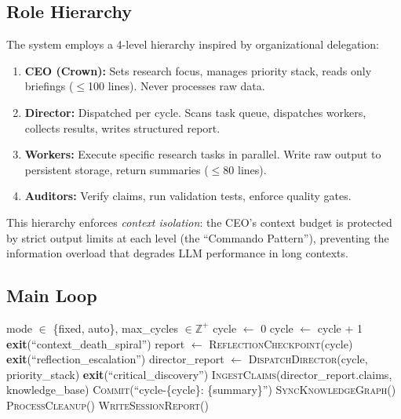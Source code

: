 \documentclass[11pt,a4paper]{article}
\begin{document}
\subsection{Role Hierarchy}
\label{sec:roles}

The system employs a 4-level hierarchy inspired by organizational delegation:

\begin{enumerate}[nosep]
    \item \textbf{CEO (Crown):} Sets research focus, manages priority stack, reads
          only briefings ($\leq$100 lines). Never processes raw data.
    \item \textbf{Director:} Dispatched per cycle. Scans task queue, dispatches
          workers, collects results, writes structured report.
    \item \textbf{Workers:} Execute specific research tasks in parallel. Write raw
          output to persistent storage, return summaries ($\leq$80 lines).
    \item \textbf{Auditors:} Verify claims, run validation tests, enforce quality gates.
\end{enumerate}

This hierarchy enforces \emph{context isolation}: the CEO's context budget is
protected by strict output limits at each level (the ``Commando Pattern''), preventing
the information overload that degrades LLM performance in long contexts.

\subsection{Main Loop}
\label{sec:loop}

\begin{algorithm}[t]
\caption{Keter Autonomous Research Loop}
\label{alg:loop}
\begin{algorithmic}[1]
\REQUIRE mode $\in$ \{fixed, auto\}, max\_cycles $\in \mathbb{Z}^+$
\STATE cycle $\leftarrow$ 0
    \STATE cycle $\leftarrow$ cycle + 1
        \STATE \textbf{exit}(``context\_death\_spiral'')
    \ENDIF
        \STATE report $\leftarrow$ \textsc{ReflectionCheckpoint}(cycle)
            \STATE \textbf{exit}(``reflection\_escalation'')
        \ENDIF
    \ENDIF
    \STATE director\_report $\leftarrow$ \textsc{DispatchDirector}(cycle, priority\_stack)
        \STATE \textbf{exit}(``critical\_discovery'')
    \ENDIF
    \STATE \textsc{IngestClaims}(director\_report.claims, knowledge\_base)
    \STATE \textsc{Commit}(``cycle-\{cycle\}: \{summary\}'')
    \STATE \textsc{SyncKnowledgeGraph}()
    \STATE \textsc{ProcessCleanup}()
\ENDWHILE
\STATE \textsc{WriteSessionReport}()
\end{algorithmic}
\end{algorithm}
\end{document}
